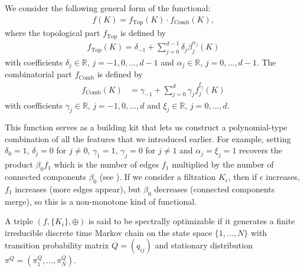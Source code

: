 We consider the following general form of the functional:
\begin{align*}
    f(K)=f_{\text{Top}}(K)\cdot f_{\text{Comb}}(K),
\end{align*}
where the topological part $f_{\text{Top}}$ is defined by
\begin{align*}
    f_{\text{Top}}(K)=\delta_{-1}+\sum_{j=0}^{d-1}\delta_j\beta_j^{\alpha_j}(K)
\end{align*}
with coefficients $\delta_j\in\mathbb{R}$, $j=-1,0,\dots,d-1$ and $\alpha_j\in\mathbb{R}$, $j=0,\dots,d-1$. The combinatorial part $f_{\text{Comb}}$ is defined by
\begin{align*}
    f_{\text{Comb}}(K)&=\gamma_{-1}+\sum_{j=0}^{d}\gamma_jf_j^{\xi_j}(K)
\end{align*}
with coefficients $\gamma_j\in\mathbb{R}$, $j=-1,0,\dots,d$ and $\xi_{j}\in\mathbb{R}$, $j=0,\dots,d$.

This function serves as a building kit that lets us construct a polynomial-type combination of all the features that we introduced earlier. For example, setting $\delta_0=1$, $\delta_j=0$ for $j\ne 0$, $\gamma_1=1$, $\gamma_j=0$ for $j\ne1$ and $\alpha_j=\xi_j=1$ recovers the product $\beta_0f_1$ which is the number of edges $f_1$ multiplied by the number of connected components $\beta_0$ (see \cite{leonov-report}). If we consider a filtration $K_{\epsilon}$, then if $\epsilon$ increases, $f_1$ increases (more edges appear), but $\beta_0$ decreases (connected components merge), so this is a non-monotone kind of functional.



\begin{Def}
    A triple $(f,\{K_i\},\oplus)$ is said to be spectrally optimizable if it generates a finite irreducible discrete time Markov chain on the state space $\{1,\dots,N\}$ with transition probability matrix $Q=(q_{ij})$ and stationary distribution $\pi^Q=(\pi_1^Q,\dots,\pi_N^Q)$.
\end{Def}

